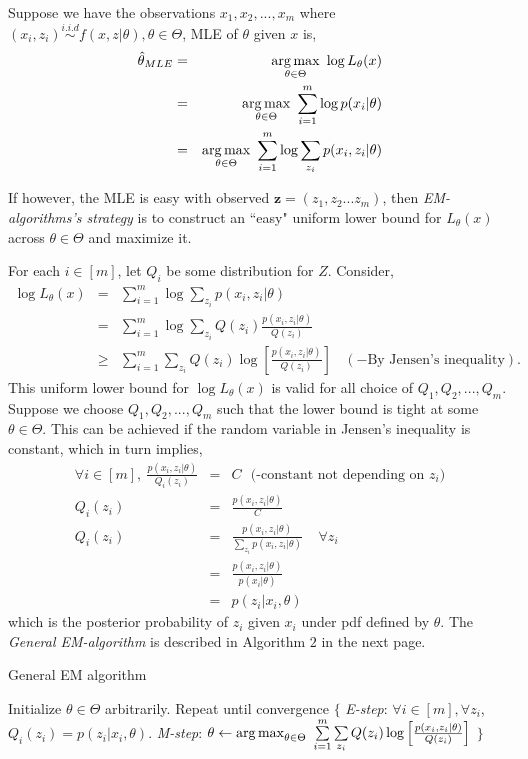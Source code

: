 \documentclass[a4paper,english,12pt]{article}
\begin{document}
Suppose we have the observations $x_1, x_2,...,x_m$ where $(x_i,z_i) \overset{i.i.d}{\sim} f(x,z|\theta), \theta \in \Theta$, MLE of $\theta$ given $x$ is,
\begin{eqnarray*}
\hat{\theta}_{MLE} &=& \operatorname*{arg\,max}_{\theta \in \Theta} ~\log L_\theta (x)\\
&=& \operatorname*{arg\,max}_{\theta \in \Theta} ~\sum\limits_{i=1}^m\log p(x_i|\theta)\\
&=& \operatorname*{arg\,max}_{\theta \in \Theta} ~\sum\limits_{i=1}^m\log \sum\limits_{z_i}p(x_i,z_i|\theta)
\end{eqnarray*}

If however, the MLE is easy with observed $\textbf{z}=(z_1, z_2...z_m)$, then \textit{EM-algorithms's strategy} is to construct an ``easy" uniform lower bound for $L_\theta (x)$ across $\theta \in \Theta$ and maximize it. 

For each $i \in [m]$, let $Q_i$ be some distribution for $Z$. Consider,
\begin{eqnarray*}
\log L_\theta (x) &=&\sum\limits_{i=1}^m\log \sum\limits_{z_i}p(x_i,z_i|\theta)\\
&=&\sum\limits_{i=1}^m\log \sum\limits_{z_i}Q(z_i)\frac{p(x_i,z_i|\theta)}{Q(z_i)}\\
&\geq &\sum\limits_{i=1}^m \sum\limits_{z_i}Q(z_i)\log \left[ \frac{p(x_i,z_i|\theta)}{Q(z_i)} \right] ~~~~(-\text{By Jensen's inequality}).
\end{eqnarray*}
This uniform lower bound for $\log L_\theta (x)$ is valid for all choice of $Q_1, Q_2,...,Q_m$. Suppose we choose $Q_1, Q_2,...,Q_m$ such that the lower bound is tight at some $\theta \in \Theta$. This can be achieved if the random variable in Jensen's inequality is constant, which in turn implies,  
\begin{eqnarray*}
\forall i \in [m ], ~\frac{p(x_i,z_i|\theta)}{Q_i(z_i)} &=& C ~~~\text{(-constant not depending on $z_i$)} \\
Q_i(z_i) &=& \frac{p(x_i,z_i|\theta)}{C}\\
Q_i(z_i) &=& \frac{p(x_i,z_i|\theta)}{\sum\limits_{z_i}p(x_i,z_i|\theta)}~~~~~\forall z_i\\
&=& \frac{p(x_i,z_i|\theta)}{p(x_i|\theta)}\\
&=& p(z_i|x_i,\theta)
\end{eqnarray*}
which is the posterior probability of $z_i$ given $x_i$ under pdf defined by $\theta$. The \textit{General EM-algorithm} is described in Algorithm $2$ in the next page.
\begin{algorithm}
\caption{General EM algorithm}\label{euclid}
\begin{algorithmic}[1]
\Procedure{}{}
\State Initialize  $\theta \in \Theta$ arbitrarily.
\State Repeat until convergence $\lbrace$
\BState \emph{E-step}:
\State $\forall i \in [m], \forall z_i$,
\State $Q_i(z_i) = p(z_i|x_i, \theta)$.
\BState \emph{M-step}: 
\State $\theta \gets \operatorname*{arg\,max}_{\theta \in \Theta} ~\sum\limits_{i=1}^m \sum\limits_{z_i}Q(z_i)\log \left[ \frac{p(x_i,z_i|\theta)}{Q(z_i)} \right]$  
\State $\rbrace$
\EndProcedure
\end{algorithmic}
\end{algorithm}
\newpage
\end{document}
